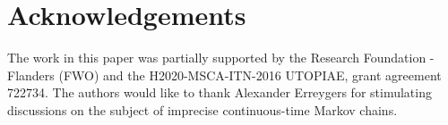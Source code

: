 \documentclass[3p]{elsarticle}
\begin{document}
\gdef\thesection{\Alph{section}} %
\makeatletter
\renewcommand\@seccntformat[1]{Appendix \csname the#1\endcsname.\hspace{0.5em}}
\makeatother

\section*{Acknowledgements}
The work in this paper was partially supported by the Research Foundation - Flanders (FWO) and the H2020-MSCA-ITN-2016 UTOPIAE, grant agreement 722734. The authors would like to thank Alexander Erreygers for stimulating discussions on the subject of imprecise continuous-time Markov chains.%
\quad\newline\newline
\end{document}
